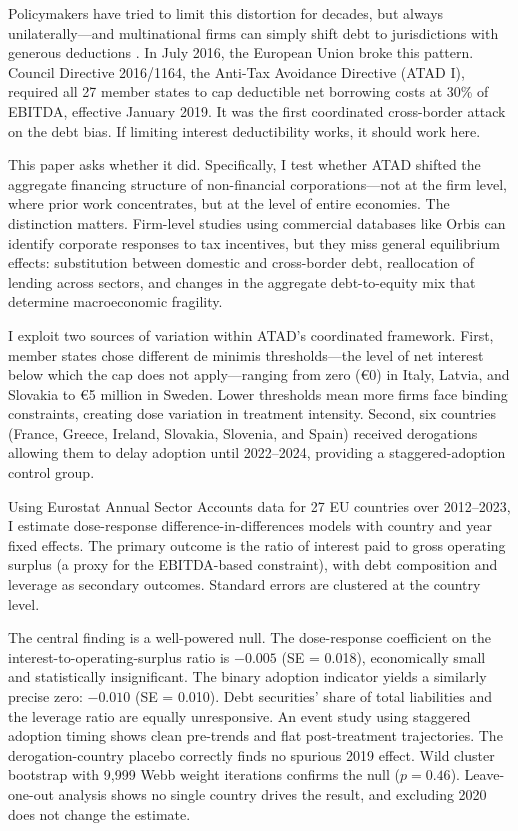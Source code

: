 \documentclass[12pt]{article}
\begin{document}
Policymakers have tried to limit this distortion for decades, but always unilaterally---and multinational firms can simply shift debt to jurisdictions with generous deductions \citep{desai2004taxonomy, huizinga2008capital}. In July 2016, the European Union broke this pattern. Council Directive 2016/1164, the Anti-Tax Avoidance Directive (ATAD I), required all 27 member states to cap deductible net borrowing costs at 30\% of EBITDA, effective January 2019. It was the first coordinated cross-border attack on the debt bias. If limiting interest deductibility works, it should work here.

This paper asks whether it did. Specifically, I test whether ATAD shifted the aggregate financing structure of non-financial corporations---not at the firm level, where prior work concentrates, but at the level of entire economies. The distinction matters. Firm-level studies using commercial databases like Orbis \citep{blouin2014thin, buettner2012impact} can identify corporate responses to tax incentives, but they miss general equilibrium effects: substitution between domestic and cross-border debt, reallocation of lending across sectors, and changes in the aggregate debt-to-equity mix that determine macroeconomic fragility.

I exploit two sources of variation within ATAD's coordinated framework. First, member states chose different de minimis thresholds---the level of net interest below which the cap does not apply---ranging from zero (\euro{}0) in Italy, Latvia, and Slovakia to \euro{}5 million in Sweden. Lower thresholds mean more firms face binding constraints, creating dose variation in treatment intensity. Second, six countries (France, Greece, Ireland, Slovakia, Slovenia, and Spain) received derogations allowing them to delay adoption until 2022--2024, providing a staggered-adoption control group.

Using Eurostat Annual Sector Accounts data for 27 EU countries over 2012--2023, I estimate dose-response difference-in-differences models with country and year fixed effects. The primary outcome is the ratio of interest paid to gross operating surplus (a proxy for the EBITDA-based constraint), with debt composition and leverage as secondary outcomes. Standard errors are clustered at the country level.

The central finding is a well-powered null. The dose-response coefficient on the interest-to-operating-surplus ratio is $-0.005$ (SE = 0.018), economically small and statistically insignificant. The binary adoption indicator yields a similarly precise zero: $-0.010$ (SE = 0.010). Debt securities' share of total liabilities and the leverage ratio are equally unresponsive. An event study using staggered adoption timing shows clean pre-trends and flat post-treatment trajectories. The derogation-country placebo correctly finds no spurious 2019 effect. Wild cluster bootstrap with 9{,}999 Webb weight iterations confirms the null ($p = 0.46$). Leave-one-out analysis shows no single country drives the result, and excluding 2020 does not change the estimate.
\end{document}
